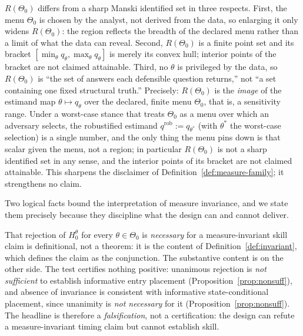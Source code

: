 \documentclass[risks,article,submit,pdftex,oneauthor]{Definitions/mdpi}
\begin{document}
\begin{Remark}
\label{rem:id-vs-manski}
$R(\Theta_0)$ differs from a sharp Manski identified set in three respects. First,
the menu $\Theta_0$ is chosen by the analyst, not derived from the data, so
enlarging it only widens $R(\Theta_0)$: the region reflects the breadth of the
declared menu rather than a limit of what the data can reveal. Second,
$R(\Theta_0)$ is a finite point set and its bracket
$[\min_\theta q_\theta,\max_\theta q_\theta]$ is merely its convex hull; interior
points of the bracket are not claimed attainable. Third, no $\theta$ is privileged
by the data, so $R(\Theta_0)$ is ``the set of answers each defensible question
returns,'' not ``a set containing one fixed structural truth.'' Precisely:
$R(\Theta_0)$ is the \emph{image} of the estimand map $\theta\mapsto q_\theta$ over
the declared, finite menu $\Theta_0$, that is, a sensitivity range. Under a
worst-case stance that treats $\Theta_0$ as a menu over which an adversary selects,
the robustified estimand $q^{\mathrm{rob}}:=q_{\theta^\ast}$ (with $\theta^\ast$ the
worst-case selection) is a single number, and the only thing the menu pins down is
that scalar given the menu, not a region; in particular $R(\Theta_0)$ is not a sharp
identified set in any sense, and the interior points of its bracket are not claimed
attainable. This sharpens the disclaimer of
Definition~\ref{def:measure-family}; it strengthens no claim.
\end{Remark}

Two logical facts bound the interpretation of measure invariance, and we state them
precisely because they discipline what the design can and cannot deliver.

\begin{Remark}
\label{rem:necessity}
That rejection of $H_0^\theta$ for every $\theta\in\Theta_0$ is \emph{necessary}
for a measure-invariant skill claim is definitional, not a theorem: it is the
content of Definition~\ref{def:invariant}, which defines the claim as the
conjunction. The substantive content is on the other side. The test certifies
nothing positive: unanimous rejection is \emph{not sufficient} to establish
informative entry placement (Proposition~\ref{prop:nonsuff}), and absence of
invariance is consistent with informative state-conditional placement, since
unanimity is \emph{not necessary} for it (Proposition~\ref{prop:nonsuff}). The
headline is therefore a \emph{falsification}, not a certification: the design can
refute a measure-invariant timing claim but cannot establish skill.
\end{Remark}
\end{document}
